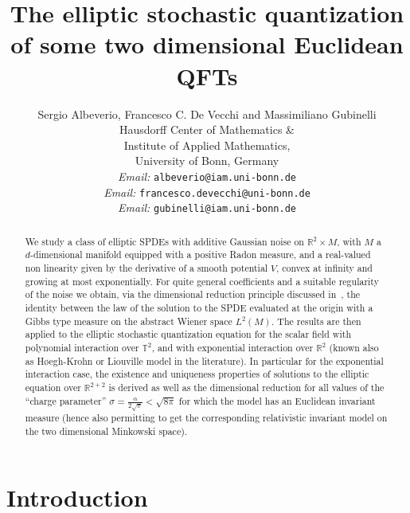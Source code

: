 \documentclass[a4paper,10pt]{article}
\newcommand{\tmaffiliation}[1]{\\ #1}
\newcommand{\tmemail}[1]{\\ \textit{Email:} \texttt{#1}}
\begin{document}
\title{
  The elliptic stochastic quantization\\
  of some two dimensional Euclidean QFTs
}

\author{
  Sergio Albeverio, Francesco C. De Vecchi and Massimiliano Gubinelli
  \tmaffiliation{Hausdorff Center of Mathematics \&\\
  Institute of Applied Mathematics, \\
  University of Bonn, Germany}
  \tmemail{albeverio@iam.uni-bonn.de}
  \tmemail{francesco.devecchi@uni-bonn.de}
  \tmemail{gubinelli@iam.uni-bonn.de}
}

\maketitle

\begin{abstract}
  We study a class of elliptic SPDEs with additive Gaussian noise on
  $\mathbb{R}^2 \times M$, with $M$ a $d$-dimensional manifold equipped with a
  positive Radon measure, and a real-valued non linearity given by the
  derivative of a smooth potential $V$, convex at infinity and growing at most
  exponentially. For quite general coefficients and a suitable regularity of
  the noise we obtain, via the dimensional reduction principle discussed
  in~{\cite{Albeverio2018elliptic}}, the identity between the law of the
  solution to the SPDE evaluated at the origin with a Gibbs type measure on
  the abstract Wiener space $L^2 (M)$. The results are then applied to the
  elliptic stochastic quantization equation for the scalar field with
  polynomial interaction over $\mathbb{T}^2$, and with exponential interaction
  over $\mathbb{R}^2$ (known also as H{\o}egh-Krohn or Liouville model in the
  literature). In particular for the exponential interaction case, the
  existence and uniqueness properties of solutions to the elliptic equation
  over $\mathbb{R}^{2 + 2}$ is derived as well as the dimensional reduction
  for all values of the ``charge parameter'' $\sigma = \frac{\alpha}{2
  \sqrt{\pi}} < \sqrt{8 \pi}$ for which the model has an Euclidean invariant
  measure (hence also permitting to get the corresponding relativistic
  invariant model on the two dimensional Minkowski space).
\end{abstract}

{\tableofcontents}

\section{Introduction}
\end{document}
